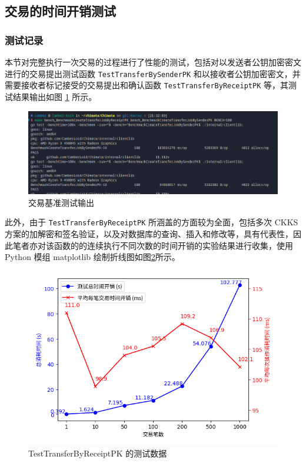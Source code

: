 \subsection{交易的时间开销测试}

\subsubsection{测试记录}

本节对完整执行一次交易的过程进行了性能的测试，包括对以发送者公钥加密密文进行的交易提出测试函数 \verb|TestTransferBySenderPK| 和以接收者公钥加密密文，并需要接收者标记接受的交易提出和确认函数 \verb|TestTransferByReceiptPK| 等，其测试结果输出如图 \ref{Fig:bench_transaction} 所示。

\begin{figure}
    \centering
    \includegraphics[width=0.8\linewidth]{./Figures/Bench_Transaction_all.png}
    \caption{交易基准测试输出}\label{Fig:bench_transaction}
\end{figure}

此外，由于 \verb|TestTransferByReceiptPK| 所涵盖的方面较为全面，包括多次 CKKS 方案的加解密和签名验证，以及对数据库的查询、插入和修改等，具有代表性，因此笔者亦对该函数的的连续执行不同次数的时间开销的实验结果进行收集，使用 Python 模组 matplotlib 绘制折线图如图\ref{Fig:graph_bench_transaction}所示。

\begin{figure}
    \centering
    \includegraphics[width=0.8\linewidth]{./Figures/matplots/Bench_CreateTransferJobByReceiptPK.png}
    \caption{TestTransferByReceiptPK 的测试数据}\label{Fig:graph_bench_transaction}
\end{figure}

